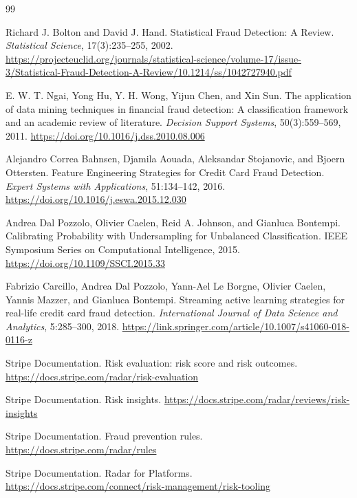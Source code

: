 \documentclass[11pt]{article}
\begin{document}
\begin{thebibliography}{99}

Richard J. Bolton and David J. Hand.
\newblock Statistical Fraud Detection: A Review.
\newblock \emph{Statistical Science}, 17(3):235--255, 2002.
\newblock \url{https://projecteuclid.org/journals/statistical-science/volume-17/issue-3/Statistical-Fraud-Detection-A-Review/10.1214/ss/1042727940.pdf}

E. W. T. Ngai, Yong Hu, Y. H. Wong, Yijun Chen, and Xin Sun.
\newblock The application of data mining techniques in financial fraud detection: A classification framework and an academic review of literature.
\newblock \emph{Decision Support Systems}, 50(3):559--569, 2011.
\newblock \url{https://doi.org/10.1016/j.dss.2010.08.006}

Alejandro Correa Bahnsen, Djamila Aouada, Aleksandar Stojanovic, and Bjoern Ottersten.
\newblock Feature Engineering Strategies for Credit Card Fraud Detection.
\newblock \emph{Expert Systems with Applications}, 51:134--142, 2016.
\newblock \url{https://doi.org/10.1016/j.eswa.2015.12.030}

Andrea Dal Pozzolo, Olivier Caelen, Reid A. Johnson, and Gianluca Bontempi.
\newblock Calibrating Probability with Undersampling for Unbalanced Classification.
\newblock IEEE Symposium Series on Computational Intelligence, 2015.
\newblock \url{https://doi.org/10.1109/SSCI.2015.33}

Fabrizio Carcillo, Andrea Dal Pozzolo, Yann-Ael Le Borgne, Olivier Caelen,
Yannis Mazzer, and Gianluca Bontempi.
\newblock Streaming active learning strategies for real-life credit card fraud detection.
\newblock \emph{International Journal of Data Science and Analytics}, 5:285--300, 2018.
\newblock \url{https://link.springer.com/article/10.1007/s41060-018-0116-z}

Stripe Documentation.
\newblock Risk evaluation: risk score and risk outcomes.
\newblock \url{https://docs.stripe.com/radar/risk-evaluation}

Stripe Documentation.
\newblock Risk insights.
\newblock \url{https://docs.stripe.com/radar/reviews/risk-insights}

Stripe Documentation.
\newblock Fraud prevention rules.
\newblock \url{https://docs.stripe.com/radar/rules}

Stripe Documentation.
\newblock Radar for Platforms.
\newblock \url{https://docs.stripe.com/connect/risk-management/risk-tooling}


\end{thebibliography}
\end{document}
